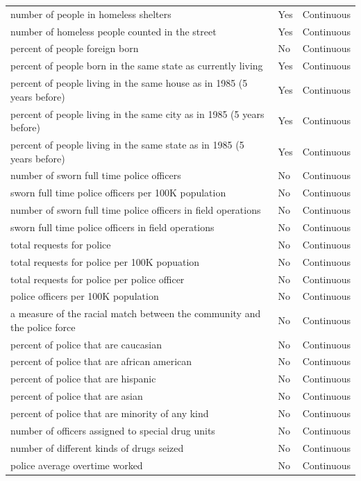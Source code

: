 \documentclass[
  11pt,
]{article}
\begin{document}
\begin{longtable}[t]{lll}
number of people in homeless shelters & Yes & Continuous\\
\addlinespace
number of homeless people counted in the street & Yes & Continuous\\
percent of people foreign born & No & Continuous\\
percent of people born in the same state as currently living & Yes & Continuous\\
percent of people living in the same house as in 1985 (5 years before) & Yes & Continuous\\
percent of people living in the same city as in 1985 (5 years before) & Yes & Continuous\\
\addlinespace
percent of people living in the same state as in 1985 (5 years before) & Yes & Continuous\\
number of sworn full time police officers & No & Continuous\\
sworn full time police officers per 100K population & No & Continuous\\
number of sworn full time police officers in field operations & No & Continuous\\
sworn full time police officers in field operations & No & Continuous\\
\addlinespace
total requests for police & No & Continuous\\
total requests for police per 100K popuation & No & Continuous\\
total requests for police per police officer & No & Continuous\\
police officers per 100K population & No & Continuous\\
a measure of the racial match between the community and the police force & No & Continuous\\
\addlinespace
percent of police that are caucasian & No & Continuous\\
percent of police that are african american & No & Continuous\\
percent of police that are hispanic & No & Continuous\\
percent of police that are asian & No & Continuous\\
percent of police that are minority of any kind & No & Continuous\\
\addlinespace
number of officers assigned to special drug units & No & Continuous\\
number of different kinds of drugs seized & No & Continuous\\
police average overtime worked & No & Continuous\\

\end{longtable}
\end{document}
